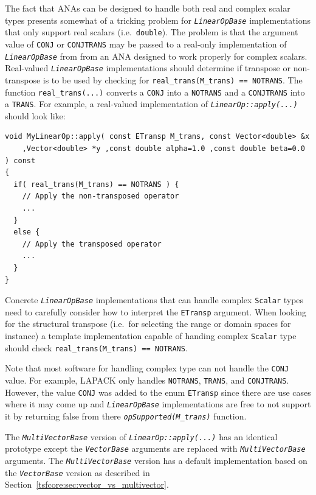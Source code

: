\documentclass[pdf,ps2pdf,11pt]{SANDreport}
\begin{document}
The fact that ANAs can be designed to handle both real and complex scalar
types presents somewhat of a tricking problem for
{}\texttt{\textit{Linear\-Op\-Base}} implementations that only support real
scalars (i.e.~{}\texttt{double}).  The problem is that the argument value of
{}\texttt{CONJ} or {}\texttt{CONJTRANS} may be passed to a real-only
implementation of {}\texttt{\textit{Linear\-Op\-Base}} from from an ANA
designed to work properly for complex scalars.  Real-valued
{}\texttt{\textit{Linear\-Op\-Base}} implementations should determine if
transpose or non-transpose is to be used by checking for
{}\texttt{real\-\_trans(M\_trans) == NOTRANS}.  The function
{}\texttt{real\-\_trans(...)} converts a {}\texttt{CONJ} into a
{}\texttt{NOTRANS} and a {}\texttt{CONJTRANS} into a {}\texttt{TRANS}.  For
example, a real-valued implementation of
{}\texttt{\textit{LinearOp\-::apply(\-...)}} should look like:

{\scriptsize\begin{verbatim}
void MyLinearOp::apply( const ETransp M_trans, const Vector<double> &x
    ,Vector<double> *y ,const double alpha=1.0 ,const double beta=0.0 ) const
{
  if( real_trans(M_trans) == NOTRANS ) {
    // Apply the non-transposed operator
    ...
  }
  else {
    // Apply the transposed operator
    ...
  }
}
\end{verbatim}}

Concrete {}\texttt{\textit{Linear\-Op\-Base}} implementations that can handle
complex {}\texttt{Scalar} types need to carefully consider how to interpret
the {}\texttt{ETransp} argument.  When looking for the structural transpose
(i.e.\ for selecting the range or domain spaces for instance) a template
implementation capable of handing complex {}\texttt{Scalar} type should check
{}\texttt{real\-\_trans(M\_trans) == NOTRANS}.

Note that most software for handling complex type can not handle the
{}\texttt{CONJ} value.  For example, LAPACK only handles {}\texttt{NOTRANS},
{}\texttt{TRANS}, and {}\texttt{CONJTRANS}.  However, the value
{}\texttt{CONJ} was added to the enum {}\texttt{ETransp} since there are use
cases where it may come up and {}\texttt{\textit{Linear\-Op\-Base}}
implementations are free to not support it by returning false from there
{}\texttt{\textit{opSupported(M\_trans)}} function.

The {}\texttt{\textit{Multi\-Vector\-Base}} version of
{}\texttt{\textit{LinearOp\-::apply(\-...)}} has an identical prototype except
the {}\texttt{\textit{Vector\-Base}} arguments are replaced with
{}\texttt{\textit{Multi\-Vector\-Base}} arguments.  The
{}\texttt{\textit{Multi\-Vector\-Base}} version has a default implementation
based on the {}\texttt{\textit{Vector\-Base}} version as described in
Section~\ref{tsfcore:sec:vector_vs_multivector}.
\end{document}

